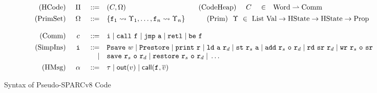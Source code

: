 \begin{figure*}[!t]
    \centering
    \small
    \[
        \begin{array}{rcclcrccl}
            \TYPE{(HCode)} & \ \HMd \ & \define & (\code, \hprimset) & &
            \qquad\,
            \TYPE{(CodeHeap)} & \ \code \ & \in & \TYPE{Word} \rightharpoonup \TYPE{Comm}
            \\
            \\[-8pt]
            \TYPE{(PrimSet)} & \hprimset & \define &
            \multicolumn{6}{l}
                {
                    \{ \lab{1} \rightsquigarrow \hprim_1, \dots, \lab{n} \rightsquigarrow \hprim_n \}
                    \qquad\quad
                    \TYPE{(Prim)} \ \ \hprim \ \in \
                    \TYPE{List} \ \TYPE{Val} \rightarrow \TYPE{HState} \rightarrow
                    \TYPE{HState} \rightarrow \TYPE{Prop}
                }  \\
            \\
            \TYPE{(Comm)} & \comm & \define &
            \multicolumn{6}{l}
            {
                \simplins{} \sepline \call{} \ \lab{}
                \sepline \jmp{} \ \aexp \sepline \retl \sepline \be{} \ \lab{}
            }
            \\
            \\[-8pt]
            \TYPE{(SimpIns)} & \simplins{} & \define &
            \multicolumn{6}{l}
            {
                \Psave \ \word \sepline \Prestore  \sepline \cprint \ \reg{} \sepline
                \ld{} \ \aexp \ \reg{d} \sepline
                \st{} \ \reg{s} \ \aexp \sepline \cadd{} \ \reg{s} \ \oexp \ \reg{d}
                \sepline
                \rd \ \sr \ \reg{d} \sepline \cwr \ \reg{s} \ \oexp \ \sr
            }
            \\
            & & \quad | &
            \multicolumn{6}{l}
            {
                \csave{} \ \reg{s} \ \oexp \ \reg{d} \sepline
                \crestore{} \ \reg{s} \ \oexp \ \reg{d} \sepline
                \dots
            }
            \\
            \\[-8pt]
            \TYPE{(HMsg)} & \hmsg & \define & \empmsg \sepline \outEvt{\val} \sepline
            \callEvt{\lab{}, \args{\val}}
        \end{array}
    \]
    \vspace{-1em}
    \caption{Syntax of Pseudo-SPARCv8 Code}
    \label{fig:syntax-of-concur-pseudo-sparc}
\end{figure*}
